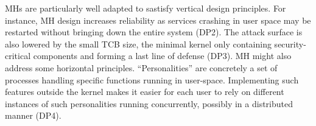 \documentclass{sig-alternate}
\begin{document}
MHs are particularly well adapted to sastisfy vertical design principles.
For instance, MH design increases reliability as services crashing in user space may be restarted without bringing down the entire system (DP2).
The attack surface is also lowered by the small TCB size, the minimal kernel only containing security-critical components and forming a last line of defense (DP3).
MH might also address some horizontal principles. 
``Personalities'' are concretely a set of processes handling specific functions running in user-space. Implementing such features outside the kernel makes it easier for each user to rely on different instances of such personalities running concurrently, possibly in a distributed manner (DP4).




%
\end{document}
